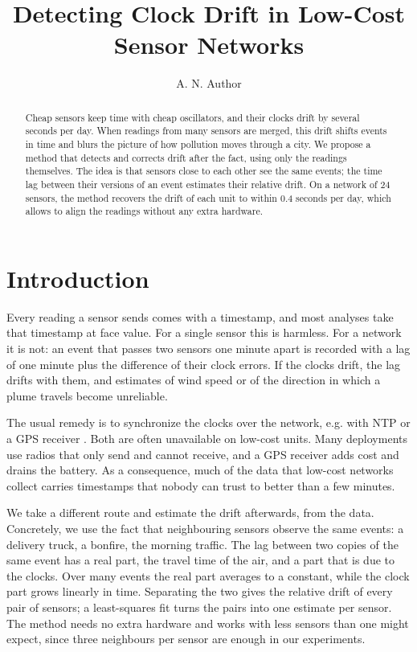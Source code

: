 \documentclass{article}
\title{Detecting Clock Drift in Low-Cost Sensor Networks}
\author{A. N. Author}
\date{}
\newcommand{\eg}{e.g.\xspace}
\begin{document}
\maketitle

\begin{abstract}

Cheap sensors keep time with cheap oscillators, and their clocks drift by
several seconds per day. When readings from many sensors are merged, this
drift shifts events in time and blurs the picture of how pollution moves
through a city. We propose a method that detects and corrects drift after
the fact, using only the readings themselves. The idea is that sensors close
to each other see the same events; the time lag between their versions of an
event estimates their relative drift. On a network of 24 sensors, the method
recovers the drift of each unit to within 0.4 seconds per day, which allows
to align the readings without any extra hardware.

\end{abstract}

\section{Introduction}

Every reading a sensor sends comes with a timestamp, and most analyses take
that timestamp at face value. For a single sensor this is harmless. For a
network it is not: an event that passes two sensors one minute apart is
recorded with a lag of one minute plus the difference of their clock errors.
If the clocks drift, the lag drifts with them, and estimates of wind speed
or of the direction in which a plume travels become unreliable.

The usual remedy is to synchronize the clocks over the network, \eg with NTP
or a GPS receiver \citep{elson2002fine}. Both are often unavailable on
low-cost units. Many deployments use radios that only send and cannot
receive, and a GPS receiver adds cost and drains the battery. As a
consequence, much of the data that low-cost networks collect carries
timestamps that nobody can trust to better than a few minutes.

We take a different route and estimate the drift afterwards, from the data.
Concretely, we use the fact that neighbouring sensors observe the same
events: a delivery truck, a bonfire, the morning traffic. The lag between
two copies of the same event has a real part, the travel time of the air,
and a part that is due to the clocks. Over many events the real part
averages to a constant, while the clock part grows linearly in time.
Separating the two gives the relative drift of every pair of sensors; a
least-squares fit turns the pairs into one estimate per sensor. The method
needs no extra hardware and works with less sensors than one might expect,
since three neighbours per sensor are enough in our experiments.
\end{document}
